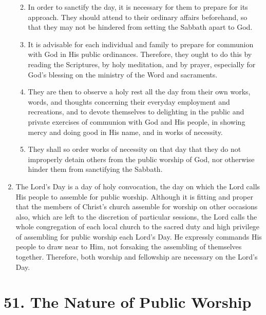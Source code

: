 \documentclass[
]{book}
\providecommand{\tightlist}{%
  \setlength{\itemsep}{0pt}\setlength{\parskip}{0pt}}
\begin{document}
\begin{enumerate}
  \begin{enumerate}
  \def\labelenumii{\alph{enumii}.}
  \tightlist
  \item
    In order to sanctify the day, it is necessary for them to prepare for its approach. They should attend to their ordinary affairs beforehand, so that they may not be hindered from setting the Sabbath apart to God.
  \item
    It is advisable for each individual and family to prepare for communion with God in His public ordinances. Therefore, they ought to do this by reading the Scriptures, by holy meditation, and by prayer, especially for God's blessing on the ministry of the Word and sacraments.
  \item
    They are then to observe a holy rest all the day from their own works, words, and thoughts concerning their everyday employment and recreations, and to devote themselves to delighting in the public and private exercises of communion with God and His people, in showing mercy and doing good in His name, and in works of necessity.
  \item
    They shall so order works of necessity on that day that they do not improperly detain others from the public worship of God, nor otherwise hinder them from sanctifying the Sabbath.
  \end{enumerate}
\item
  The Lord's Day is a day of holy convocation, the day on which the Lord calls His people to assemble for public worship. Although it is fitting and proper that the members of Christ's church assemble for worship on other occasions also, which are left to the discretion of particular sessions, the Lord calls the whole congregation of each local church to the sacred duty and high privilege of assembling for public worship each Lord's Day. He expressly commands His people to draw near to Him, not forsaking the assembling of themselves together. Therefore, both worship and fellowship are necessary on the Lord's Day.
\end{enumerate}

\hypertarget{the-nature-of-public-worship}{%
\section*{51. The Nature of Public Worship}\label{the-nature-of-public-worship}}

\protect\hypertarget{chapter-slug-51-the-nature-of-public-worship}{\href{}{}}
\end{document}
